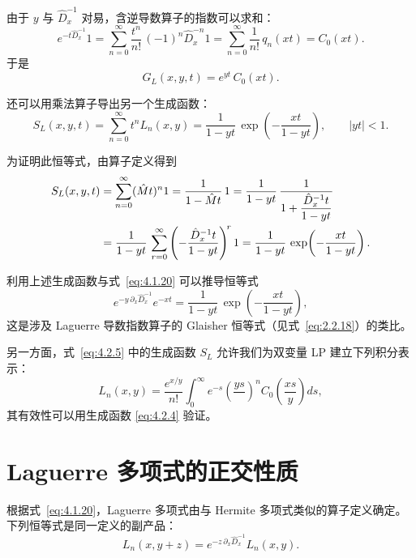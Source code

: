 由于 $y$ 与 $\hat D_x^{-1}$ 对易，含逆导数算子的指数可以求和：
\begin{equation}
e^{-t \hat D_x^{-1}} 1
= \sum_{n=0}^{\infty} \frac{t^n}{n!}\,(-1)^n \hat D_x^{-n} 1
= \sum_{n=0}^{\infty} \frac{1}{n!}\,q_n(xt)
= C_0(xt).
\label{eq:4.2.2}
\end{equation}
于是
\begin{equation}
G_L(x,y,t) = e^{yt}\,C_0(xt).
\label{eq:4.2.3}
\end{equation}

还可以用乘法算子导出另一个生成函数：
\begin{equation}
S_L(x,y,t) = \sum_{n=0}^{\infty} t^n L_n(x,y)
= \frac{1}{1-yt}\,\exp\!\left(-\frac{xt}{1-yt}\right),
\qquad |yt|<1.
\label{eq:4.2.4}
\end{equation}

为证明此恒等式，由算子定义得到
\begin{align}
S_L(x,y,t)
&= \sum_{n=0}^{\infty} (\hat M t)^n 1
 = \frac{1}{1-\hat M t}\,1
 = \frac{1}{1-yt}\,\frac{1}{1+\dfrac{\hat D_x^{-1}t}{1-yt}} \notag\\
&= \frac{1}{1-yt}\,
\sum_{r=0}^{\infty} \left(-\frac{\hat D_x^{-1}t}{1-yt}\right)^{\!r} 1
 = \frac{1}{1-yt}\,\exp\!\left(-\frac{xt}{1-yt}\right).
\label{eq:4.2.5}
\end{align}

利用上述生成函数与式~\eqref{eq:4.1.20} 可以推导恒等式
\begin{equation}
e^{-y\,\partial_x \hat D_x^{-1}} e^{-xt}
= \frac{1}{1-yt}\,\exp\!\left(-\frac{xt}{1-yt}\right),
\label{eq:4.2.6}
\end{equation}
这是涉及 Laguerre 导数指数算子的 Glaisher 恒等式（见式~\eqref{eq:2.2.18}）的类比。

另一方面，式~\eqref{eq:4.2.5} 中的生成函数 $S_L$ 允许我们为双变量 LP 建立下列积分表示：
\begin{equation}
L_n(x,y) = \frac{e^{x/y}}{n!}\int_0^{\infty} e^{-s}\left(\frac{ys}{}\right)^{\!n}
C_0\!\left(\frac{xs}{y}\right) ds,
\label{eq:4.2.7}
\end{equation}
其有效性可以用生成函数 \eqref{eq:4.2.4} 验证。

\section{Laguerre 多项式的正交性质}

根据式~\eqref{eq:4.1.20}，Laguerre 多项式由与 Hermite 多项式类似的算子定义确定。下列恒等式是同一定义的副产品：
\begin{equation}
L_n(x,y+z) = e^{-z\,\partial_x \hat D_x^{-1}} L_n(x,y).
\label{eq:4.3.1}
\end{equation}

